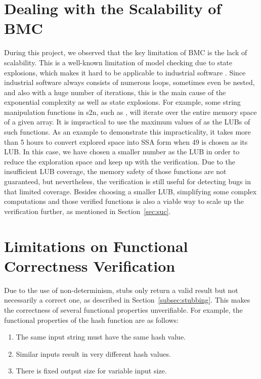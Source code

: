 \section{Dealing with the Scalability of BMC}
During this project, we observed that the key limitation of BMC is the lack of scalability. This is a well-known limitation of model checking due to state explosions, which makes it hard to be applicable to industrial software \cite{7091291}. Since industrial software always consists of numerous loops, sometimes even be nested, and also with a huge number of iterations, this is the main cause of the exponential complexity as well as state explosions. For example, some string manipulation functions in s2n, such as , will iterate over the entire memory space of a given  array. It is impractical to use the maximum values of  as the LUBs of such functions. As an example to demonstrate this impracticality, it takes more than 5 hours to convert explored space into SSA form when 49 is chosen as its LUB. In this case, we have chosen a smaller number as the LUB in order to reduce the exploration space and keep up with the verification. Due to the insufficient LUB coverage, the memory safety of those functions are not guaranteed, but nevertheless, the verification is still useful for detecting bugs in that limited coverage. Besides choosing a smaller LUB, simplifying some complex computations and those verified functions is also a viable way to scale up the verification further, as mentioned in Section~\ref{sec:suc}.


\section{Limitations on Functional Correctness Verification}
Due to the use of non-determinism, stubs only return a valid result but not necessarily a correct one, as described in Section~\ref{subsec:stubbing}. This makes the correctness of several functional properties unverifiable. For example, the functional properties of the hash function are as follows:

\begin{enumerate}[nolistsep]
    \item The same input string must have the same hash value.
    \item Similar inputs result in very different hash values.
    \item There is fixed output size for variable input size.
\end{enumerate}


